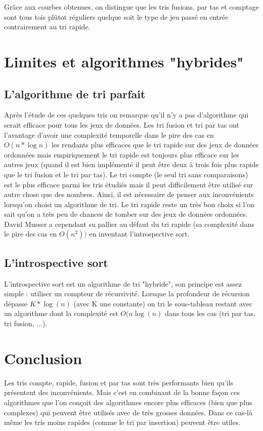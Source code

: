 \documentclass[11pt,a4paper]{article}
\begin{document}
\vspace{2cm}

Grâce aux courbes obtenues, on distingue que les tris fusions, par tas et comptage sont tous tois plûtot réguliers quelque soit le type de jeu passé en entrée contrairement au tri rapide.

\section{Limites et algorithmes "hybrides"}
\subsection{L’algorithme de tri parfait}

Après l'étude de ces quelques tris on remarque qu’il n’y a pas d’algorithme qui serait efficace pour tous
les jeux de données. Les tri fusion et tri par tas ont l’avantage d’avoir une complexité
temporelle dans le pire des cas en $\displaystyle{O(n*\log{n})}$ les rendants plus efficaces que le tri rapide sur des
jeux de données ordonnées mais empiriquement le tri rapide est toujours plus efficace sur les autres
jeux (quand il est bien implémenté il peut être deux à trois fois plus rapide que le tri fusion et le
tri par tas). Le tri compte (le seul tri sans comparaisons) est le plus efficace parmi les tris étudiés
mais il peut difficilement être utilisé sur autre chose que des nombres.
Ainsi, il est nécessaire de penser aux inconvénients lorsqu’on choisi un algorithme de tri. Le
tri rapide reste un très bon choix si l’on sait qu’on a très peu de chances de tomber sur des jeux
de données ordonnées. David Musser a cependant su pallier au défaut du tri rapide (sa complexité
dans le pire des cas en $\displaystyle{O(n^2))}$ en inventant l’introspective sort.

\subsection{L’introspective sort}
L’introspective sort est un algorithme de tri "hybride", son principe est assez simple : utiliser un compteur de récursivité.
Lorsque la profondeur de récursion dépasse $\displaystyle{K * \log{(n)}}$ (avec K une
constante) on tri le sous-tableau restant avec un algorithme dont la complexité est $\displaystyle{O(n\log{(n)}}$
dans tous les cas (tri par tas, tri fusion, ...).

\section{Conclusion}
Les tris compte, rapide, fusion et par tas sont très performants bien qu’ils présentent des
inconvénients. Mais c’est en combinant de la bonne façon ces algorithmes que l’on conçoit des
algorithmes encore plus efficaces (bien que plus complexes) qui peuvent être utilisés avec de très
grosses données. Dans ce cas-là même les tris moins rapides (comme le tri par insertion) peuvent
être utiles.
\end{document}
